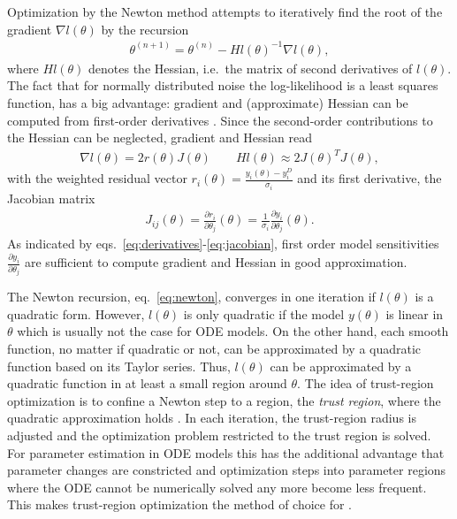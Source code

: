 \documentclass[article]{jss}
\begin{document}
Optimization by the Newton method attempts to iteratively find the root of the gradient $\nabla l (\theta)$ by the recursion
\begin{align}
	\theta^{(n+1)} = \theta^{(n)} - Hl(\theta)^{-1}\nabla l(\theta),
	\label{eq:newton}
\end{align}
where $Hl(\theta)$ denotes the Hessian, i.e.~the matrix of second derivatives of $l(\theta)$. The fact that for normally distributed noise the log-likelihood is a least squares function, has a big advantage: gradient and (approximate) Hessian can be computed from first-order derivatives  \citep{press1996numerical}. Since the second-order contributions to the Hessian can be neglected, gradient and Hessian read
\begin{align}
	\nabla l(\theta) = 2 r(\theta) J(\theta) \quad\quad Hl(\theta) \approx 2 J(\theta)^T J(\theta),
	\label{eq:derivatives}
\end{align}
with the weighted residual vector $r_i(\theta) = \frac{y_i(\theta) - y_i^D}{\sigma_i}$ and its first derivative, the Jacobian matrix
\begin{align}
	J_{ij}(\theta) = \frac{\partial r_i}{\partial \theta_j}(\theta) = \frac{1}{\sigma_i} \frac{\partial y_i}{\partial \theta_j}(\theta). \label{eq:jacobian}
\end{align}
As indicated by eqs.~\eqref{eq:derivatives}-\eqref{eq:jacobian},  first order model sensitivities $\frac{\partial y_i}{\partial\theta_j}$ are sufficient to compute gradient and Hessian in good approximation.

The Newton recursion, eq.~\eqref{eq:newton}, converges in one iteration if $l(\theta)$ is a quadratic form. However, $l(\theta)$ is only quadratic if the model $y(\theta)$ is linear in $\theta$ which is usually not the case for ODE models. On the other hand, each smooth function, no matter if quadratic or not, can be approximated by a quadratic function based on its Taylor series.
Thus, $l(\theta)$ can be approximated by a quadratic function in at least a small region around $\theta$. The idea of trust-region optimization is to confine a Newton step to a region, the \textit{trust region}, where the quadratic approximation holds \citep{wright1999numerical}.
In each iteration, the trust-region radius is adjusted and the optimization problem restricted to the trust region is solved. For parameter estimation in ODE models this has the additional advantage that parameter changes are constricted and optimization steps into parameter regions where the ODE cannot be numerically solved any more  become less frequent. This makes trust-region optimization the method of choice for .
\end{document}
